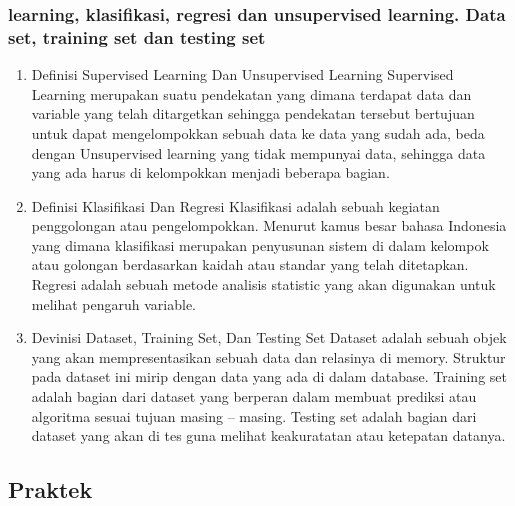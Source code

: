 	\subsubsection{learning, klasiﬁkasi, regresi dan unsupervised learning. Data set, training set dan testing set}
	\begin{enumerate}
	\item
	Definisi Supervised Learning Dan Unsupervised Learning
	\subitem
	Supervised Learning merupakan suatu pendekatan yang dimana terdapat data dan variable yang telah ditargetkan sehingga pendekatan tersebut bertujuan untuk dapat mengelompokkan sebuah data ke data yang sudah ada, beda dengan Unsupervised learning yang tidak mempunyai data, sehingga data yang ada harus di kelompokkan menjadi beberapa bagian.
	\item
	Definisi  Klasifikasi Dan Regresi
	\subitem
	Klasifikasi adalah sebuah kegiatan penggolongan atau pengelompokkan. Menurut kamus besar bahasa Indonesia yang dimana klasifikasi merupakan penyusunan sistem di dalam kelompok atau golongan berdasarkan kaidah atau standar yang telah ditetapkan. Regresi adalah sebuah metode analisis statistic yang akan digunakan untuk melihat pengaruh variable.
	\item
	Devinisi Dataset, Training Set, Dan Testing Set
	\subitem
	Dataset adalah sebuah objek yang akan mempresentasikan sebuah data dan relasinya di memory. Struktur pada dataset ini mirip dengan data yang ada di dalam database. Training set adalah bagian dari dataset yang berperan dalam membuat prediksi atau algoritma sesuai tujuan masing – masing. Testing set adalah bagian dari dataset yang akan di tes guna melihat keakuratatan atau ketepatan datanya.
	\end{enumerate}

\subsection{Praktek}
